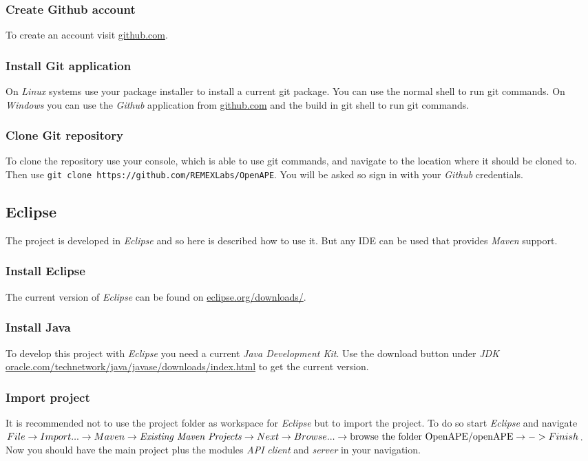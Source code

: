 \documentclass[10pt]{article}
\begin{document}
\subsubsection{Create Github account} To create an account visit \href{https://github.com/}{github.com}.
\subsubsection{Install Git application} On \emph{Linux} systems use your package installer to install a current git package. You can use the normal shell to run git commands. On \emph{Windows} you can use the \emph{Github} application from \href{https://github.com/}{github.com} and the build in git shell to run git commands.
\subsubsection{Clone Git repository} To clone the repository use your console, which is able to use git commands, and navigate to the location where it should be cloned to. Then use \texttt{git clone https://github.com/REMEXLabs/OpenAPE}. You will be asked so sign in with your \emph{Github} credentials.
\subsection{Eclipse}
The project is developed in \emph{Eclipse} and so here is described how to use it. But any IDE can be used that provides \emph{Maven} support.
\subsubsection{Install Eclipse} The current version of \emph{Eclipse} can be found on \href{https://eclipse.org/downloads/}{eclipse.org/downloads/}.
\subsubsection{Install Java} To develop this project with \emph{Eclipse} you need a current \emph{Java Development Kit}. Use the download button under \emph{JDK} \href{http://www.oracle.com/technetwork/java/javase/downloads/index.html}{oracle.com/technetwork/java/javase/downloads/index.html} to get the current version.
\subsubsection{Import project} It is recommended not to use the project folder as workspace for \emph{Eclipse} but to import the project. To do so start \emph{Eclipse} and navigate $File \rightarrow Import... \rightarrow Maven \rightarrow \text{\emph{Existing Maven Projects}} \rightarrow Next \rightarrow Browse... \rightarrow \text{browse the folder OpenAPE/openAPE} \rightarrow -> Finish$. Now you should have the main project plus the modules \emph{API} \emph{client} and \emph{server} in your navigation.
\end{document}

